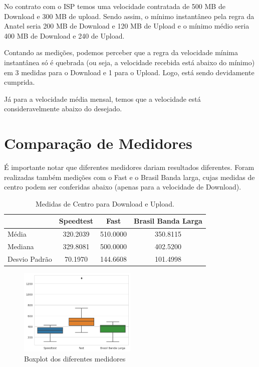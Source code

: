 \documentclass{report}
\begin{document}
No contrato com o ISP temos uma velocidade contratada de 500 MB de Download e 300 MB de upload. Sendo assim, o mínimo instantâneo pela regra da Anatel seria 200 MB de Download e 120 MB de Upload e o mínimo médio seria 400 MB de Download e 240 de Upload.

Contando as medições, podemos perceber que a regra da velocidade mínima instantânea só é quebrada (ou seja, a velocidade recebida está abaixo do mínimo) em 3 medidas para o Download e 1 para o Upload. Logo, está sendo devidamente cumprida.

Já para a velocidade média mensal, temos que a velocidade está consideravelmente abaixo do desejado.

\section{Comparação de Medidores}

É importante notar que diferentes medidores dariam resultados diferentes. Foram realizadas também medições com o Fast e o Brasil Banda larga, cujas medidas de centro podem ser conferidas abaixo (apenas para a velocidade de Download).

\begin{table}[!h]
    \begin{center}
    \caption{Medidas de Centro para Download e Upload.}
    \begin{tabular}{lccc}
        \toprule
        {}            & Speedtest & Fast      & Brasil Banda Larga\\
        \midrule
        Média         & 320.2039  & 510.0000  & 350.8115 \\
        Mediana       & 329.8081  & 500.0000  & 402.5200 \\
        Desvio Padrão & 70.1970   & 144.6608  & 101.4998 \\
        \bottomrule
    \end{tabular}
\end{center}
\end{table}

\begin{figure}[h]
    \caption{Boxplot dos diferentes medidores}
    \centering
    \includegraphics[width=0.5\textwidth]{boxplot.png}
    \end{figure}
\end{document}
